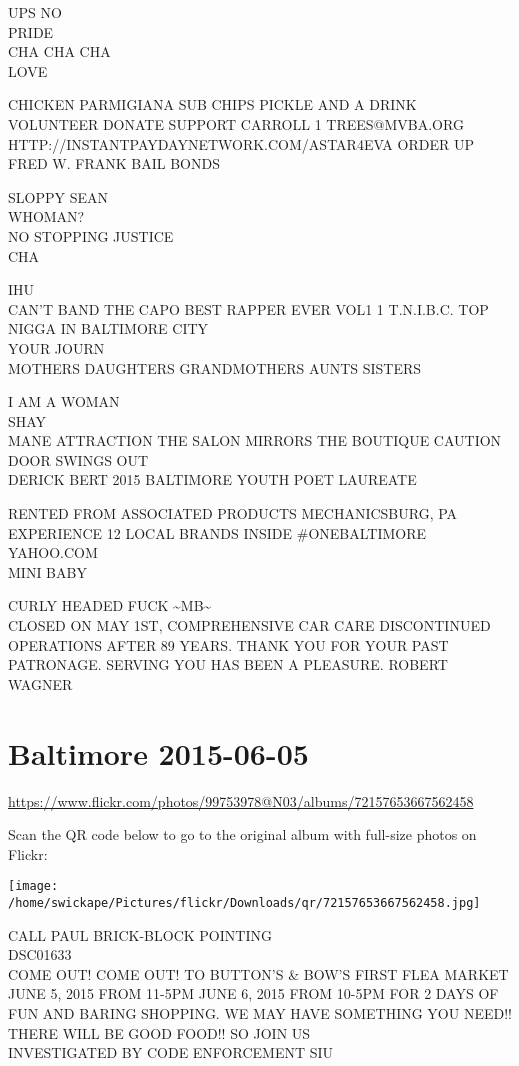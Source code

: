\documentclass[10pt,letterpaper]{article}
\begin{document}
UPS NO\\
PRIDE\\
CHA CHA CHA\\
LOVE

CHICKEN PARMIGIANA SUB CHIPS PICKLE AND A DRINK\\
VOLUNTEER DONATE SUPPORT CARROLL 1 TREES@MVBA.ORG\\
HTTP://INSTANTPAYDAYNETWORK.COM/ASTAR4EVA ORDER UP\\
FRED W. FRANK BAIL BONDS

SLOPPY SEAN\\
WHOMAN?\\
NO STOPPING JUSTICE\\
CHA

IHU\\
CAN'T BAND THE CAPO BEST RAPPER EVER VOL1 1 T.N.I.B.C. TOP NIGGA IN BALTIMORE CITY\\
YOUR JOURN\\
MOTHERS DAUGHTERS GRANDMOTHERS AUNTS SISTERS

I AM A WOMAN\\
SHAY\\
MANE ATTRACTION THE SALON MIRRORS THE BOUTIQUE CAUTION DOOR SWINGS OUT\\
DERICK BERT 2015 BALTIMORE YOUTH POET LAUREATE

RENTED FROM ASSOCIATED PRODUCTS MECHANICSBURG, PA\\
EXPERIENCE 12 LOCAL BRANDS INSIDE \#ONEBALTIMORE\\
YAHOO.COM\\
MINI BABY

CURLY HEADED FUCK \textasciitilde{}MB\textasciitilde{}\\
CLOSED ON MAY 1ST, COMPREHENSIVE CAR CARE DISCONTINUED OPERATIONS AFTER 89 YEARS.  THANK YOU FOR YOUR PAST PATRONAGE.  SERVING YOU HAS BEEN A PLEASURE.  ROBERT WAGNER


\section*{Baltimore 2015-06-05}

\url{https://www.flickr.com/photos/99753978@N03/albums/72157653667562458}

Scan the QR code below to go to the original album with full-size photos on Flickr:

\texttt{[image: /home/swickape/Pictures/flickr/Downloads/qr/72157653667562458.jpg]}


CALL PAUL BRICK{-}BLOCK POINTING\\
DSC01633\\
COME OUT!  COME OUT!  TO BUTTON'S \& BOW'S FIRST FLEA MARKET JUNE 5, 2015 FROM 11{-}5PM JUNE 6, 2015 FROM 10{-}5PM FOR 2 DAYS OF FUN AND BARING SHOPPING.  WE MAY HAVE SOMETHING YOU NEED!! THERE WILL BE GOOD FOOD!! SO JOIN US\\
INVESTIGATED BY CODE ENFORCEMENT SIU
\end{document}
